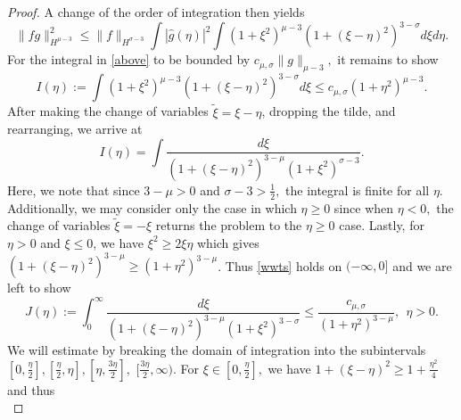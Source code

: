 \documentclass[reqno]{amsart}
\theoremstyle{plain}
\numberwithin{equation}{section}
\begin{document}
\begin{proof}
A change of the order of integration then yields
\begin{equation}\label{above}
    \| fg \|_{H^{\mu - 3}}^2 \leq 
        \|f\|_{H^{\sigma - 3}} \int \left| \hat{g}(\eta)\right|^2 \int(1 + \xi^2)^{\mu-3}(1+(\xi - \eta)^2)^{3-\sigma} d\xi d\eta. 
\end{equation}
For the integral in \eqref{above} to be bounded by $c_{\mu,\sigma}\|g\|_{\mu-3},$ it remains to show
\begin{equation}\label{wwts}
    I(\eta) := \int(1 + \xi^2)^{\mu-3}(1+(\xi - \eta)^2)^{3-\sigma}                 d\xi 
            \leq c_{\mu,\sigma}(1+\eta^2)^{\mu-3}.
\end{equation}
After making the change of variables $\tilde{\xi} = \xi - \eta$, dropping the tilde, and rearranging, we arrive at 
\begin{equation}
    I(\eta) = \int \frac{d \xi}{(1+(\xi - \eta)^2)^{3-\mu}(1 + \xi^2)^{\sigma-3}}.
\end{equation}
Here, we note that since $3 - \mu > 0$ and $\sigma - 3 > \frac12,$ the integral is finite for all $\eta.$ 
Additionally, we may consider only the case in which $\eta \geq 0$ since when $\eta < 0,$ the change of variables $\tilde{\xi} = -\xi$ returns the problem to the $\eta \geq 0$ case.  
Lastly, for $\eta >0 $ and $\xi \leq 0$, we have $\xi^2 \geq 2\xi\eta$ which gives $(1+(\xi - \eta)^2)^{3-\mu}\geq(1 + \eta^2)^{3-\mu}$. 
Thus \eqref{wwts} holds on $(-\infty, 0]$ and we are left to show 
\begin{equation}
    J(\eta) := \int_0^{\infty}\frac{d \xi}{(1+(\xi - \eta)^2)^{3-\mu}(1 + \xi^2)^{3-\sigma}} \leq \frac{c_{\mu,\sigma}}{(1 + \eta^2)^{3-\mu}}, \ \ \eta>0.
\end{equation}
We will estimate by breaking the domain of integration into the subintervals 
    $[0, \frac\eta2], [\frac\eta2,\eta], [\eta,\frac{3\eta}{2}],$ $ [\frac{3\eta}{2},\infty)$. 
For $\xi \in [0,\frac\eta2 ],$ we have 
    $1 + (\xi - \eta)^2 \geq 1 + \frac{\eta^2}{4}$ and thus 
\begin{equation*}

\end{equation*}
\end{proof}
\end{document}
